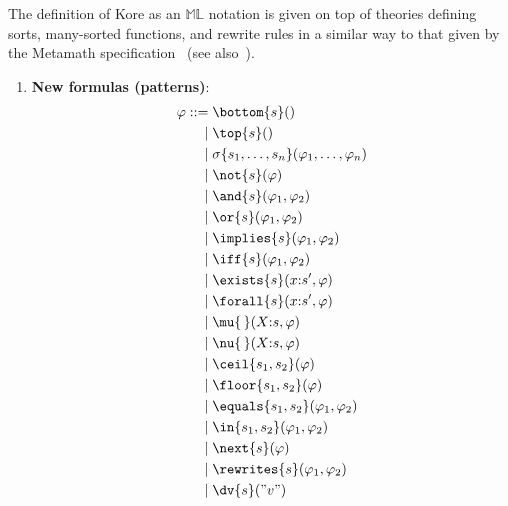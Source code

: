 \documentclass{article}
\theoremstyle{plain}
\theoremstyle{definition}
\newcommand{\ML}{$\mathbb{ML}$\xspace}
\begin{document}
The definition of Kore as an \ML notation is given on top of theories defining sorts, many-sorted functions, and rewrite rules in a similar way to that given by the Metamath specification~\cite{kore-mm-github} (see also~).
\begin{enumerate}
\item \textbf{New formulas (patterns)}: 
\begin{align*}
\varphi ::={} & \texttt{\textbackslash{}bottom}\{s\}()\\
\mid{} & \texttt{\textbackslash{}top}\{s\}()\\
\mid{} & \sigma \{s_1,\ldots, s_n\}(\varphi_1,\ldots,\varphi_n)\\
\mid{} & \texttt{\textbackslash{}not}\{s\}(\varphi)\\
\mid{} & \texttt{\textbackslash{}and}\{s\}(\varphi_1, \varphi_2)\\
\mid{} & \texttt{\textbackslash{}or}\{s\}(\varphi_1, \varphi_2)\\
\mid{} & \texttt{\textbackslash{}implies}\{s\}(\varphi_1, \varphi_2)\\
\mid{} & \texttt{\textbackslash{}iff}\{s\}(\varphi_1, \varphi_2)\\
\mid{} & \texttt{\textbackslash{}exists}\{s\}(x{:}s', \varphi)\\
\mid{} & \texttt{\textbackslash{}forall}\{s\}(x{:}s', \varphi)\\
\mid{} & \texttt{\textbackslash{}mu}\{\,\}(X{:}s, \varphi)\\
\mid{} & \texttt{\textbackslash{}nu}\{\,\}(X{:}s, \varphi)\\
\mid{} & \texttt{\textbackslash{}ceil}\{s_1, s_2\}(\varphi)\\
\mid{} & \texttt{\textbackslash{}floor}\{s_1, s_2\}(\varphi)\\
\mid{} & \texttt{\textbackslash{}equals}\{s_1, s_2\}(\varphi_1, \varphi_2)\\
\mid{} & \texttt{\textbackslash{}in}\{s_1, s_2\}(\varphi_1, \varphi_2)\\
\mid{} & \texttt{\textbackslash{}next}\{s\}(\varphi)\\
\mid{} & \texttt{\textbackslash{}rewrites}\{s\}(\varphi_1, \varphi_2)\\
\mid{} & \texttt{\textbackslash{}dv}\{s\}("v")
\end{align*}


\end{enumerate}
\end{document}
